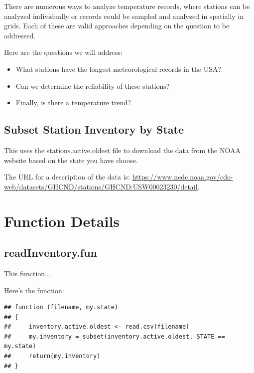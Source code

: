 \documentclass{article}\usepackage[]{graphicx}\usepackage[dvipsnames]{xcolor}
\makeatletter
\newenvironment{kframe}{%
 \def\at@end@of@kframe{}%
 \ifinner\ifhmode%
  \def\at@end@of@kframe{\end{minipage}}%
  \begin{minipage}{\columnwidth}%
 \fi\fi%
 \def\FrameCommand##1{\hskip\@totalleftmargin \hskip-\fboxsep
 \colorbox{shadecolor}{##1}\hskip-\fboxsep
     \hskip-\linewidth \hskip-\@totalleftmargin \hskip\columnwidth}%
 \MakeFramed {\advance\hsize-\width
   \@totalleftmargin\z@ \linewidth\hsize
   \@setminipage}}%
 {\par\unskip\endMakeFramed%
 \at@end@of@kframe}
\newenvironment{knitrout}{}{} %
\makeatother
\begin{document}
There are numerous ways to analyze temperature records, where stations can be analyzed individually or records could be sampled and analyzed in spatially in grids. Each of these are valid approaches depending on the question to be addressed. 

Here are the questions we will address: 

\begin{itemize}
  \item What stations have the longest meteorological records in the USA?
  \item Can we determine the reliability of these stations?
  \item Finally, is there a temperature trend?
\end{itemize}

\subsection{Subset Station Inventory by State}

This uses the stations.active.oldest file to download the data from the NOAA website based on the state you have choose.

The URL for a description of the data is: \url{https://www.ncdc.noaa.gov/cdo-web/datasets/GHCND/stations/GHCND:USW00023230/detail}.

\section{Function Details}

\subsection{readInventory.fun}\label{subsec:readInventory}

This function...

Here's the function:

\begin{knitrout}
\color{fgcolor}\begin{kframe}
\begin{verbatim}
## function (filename, my.state) 
## {
##     inventory.active.oldest <- read.csv(filename)
##     my.inventory = subset(inventory.active.oldest, STATE == my.state)
##     return(my.inventory)
## }
\end{verbatim}
\end{kframe}
\end{knitrout}
\end{document}
